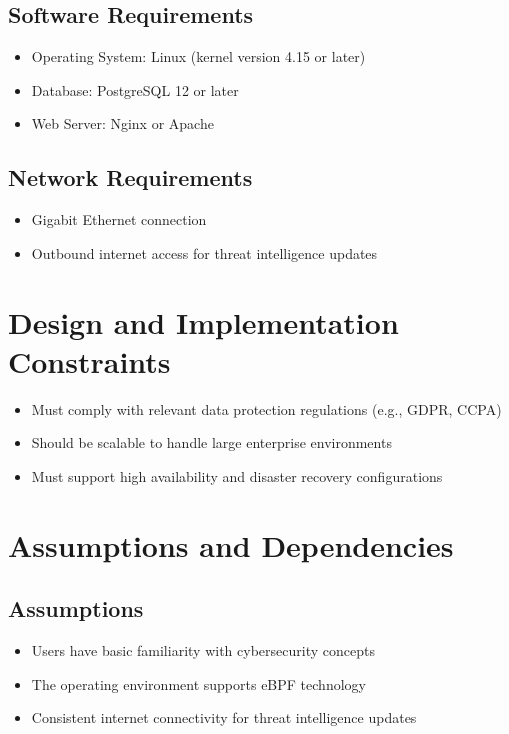 \subsection{Software Requirements}
\begin{itemize}
    \item Operating System: Linux (kernel version 4.15 or later)
    \item Database: PostgreSQL 12 or later
    \item Web Server: Nginx or Apache
\end{itemize}

\subsection{Network Requirements}
\begin{itemize}
    \item Gigabit Ethernet connection
    \item Outbound internet access for threat intelligence updates
\end{itemize}

\section{Design and Implementation Constraints}
\begin{itemize}
    \item Must comply with relevant data protection regulations (e.g., GDPR, CCPA)
    \item Should be scalable to handle large enterprise environments
    \item Must support high availability and disaster recovery configurations
\end{itemize}

\section{Assumptions and Dependencies}
\subsection{Assumptions}
\begin{itemize}
    \item Users have basic familiarity with cybersecurity concepts
    \item The operating environment supports eBPF technology
    \item Consistent internet connectivity for threat intelligence updates
\end{itemize}

